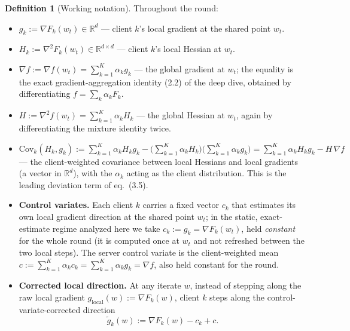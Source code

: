 \documentclass[11pt]{article}
\theoremstyle{definition}
\newtheorem{definition}[theorem]{Definition}
\theoremstyle{remark}
\begin{document}
\begin{definition}[Working notation]
Throughout the round:
\begin{itemize}
  \item $g_k:=\nabla F_k(w_t)\in\mathbb{R}^d$ --- client $k$'s local gradient at the shared
        point $w_t$.
  \item $H_k:=\nabla^2 F_k(w_t)\in\mathbb{R}^{d\times d}$ --- client $k$'s local Hessian at
        $w_t$.
  \item $\nabla f:=\nabla f(w_t)=\sum_{k=1}^{K}\alpha_k g_k$ --- the global gradient at $w_t$;
        the equality is the exact gradient-aggregation identity (2.2) of the deep dive,
        obtained by differentiating $f=\sum_k\alpha_k F_k$.
  \item $H:=\nabla^2 f(w_t)=\sum_{k=1}^{K}\alpha_k H_k$ --- the global Hessian at $w_t$, again
        by differentiating the mixture identity twice.
  \item $\mathrm{Cov}_k(H_k,g_k):=\sum_{k=1}^{K}\alpha_k H_k g_k-\Big(\sum_{k=1}^{K}\alpha_k
        H_k\Big)\Big(\sum_{k=1}^{K}\alpha_k g_k\Big)=\sum_{k=1}^{K}\alpha_k H_k g_k-H\,\nabla f$
        --- the client-weighted covariance between local Hessians and local gradients (a
        vector in $\mathbb{R}^d$), with the $\alpha_k$ acting as the client distribution. This
        is the leading deviation term of eq.~(3.5).
  \item \textbf{Control variates.} Each client $k$ carries a fixed vector $c_k$ that estimates
        its own local gradient direction at the shared point $w_t$; in the static, exact-estimate
        regime analyzed here we take $c_k:=g_k=\nabla F_k(w_t)$, held \emph{constant} for the
        whole round (it is computed once at $w_t$ and not refreshed between the two local
        steps). The server control variate is the client-weighted mean
        $c:=\sum_{k=1}^{K}\alpha_k c_k=\sum_{k=1}^{K}\alpha_k g_k=\nabla f$, also held constant
        for the round.
  \item \textbf{Corrected local direction.} At any iterate $w$, instead of stepping along the
        raw local gradient $g_{\mathrm{local}}(w):=\nabla F_k(w)$, client $k$ steps along the
        control-variate-corrected direction
        \begin{equation}
          \tilde g_k(w):=\nabla F_k(w)-c_k+c.
          \label{eq:corrected-dir}
        \end{equation}
\end{itemize}
\end{definition}
\end{document}
